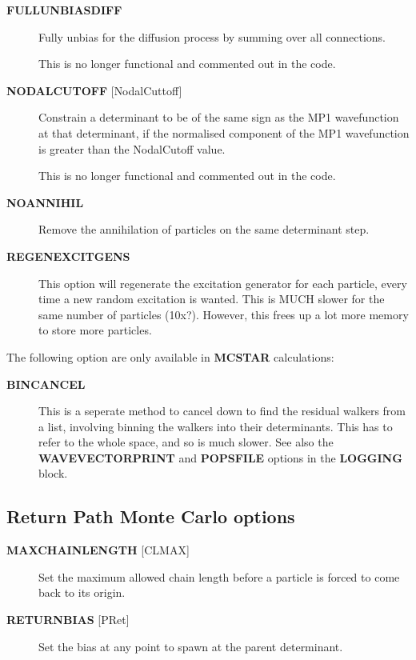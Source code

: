 \documentclass[openany,a4paper,10pt]{manual}
\begin{document}
\begin{description}
\item[\textbf{FULLUNBIASDIFF}]
Fully unbias for the diffusion process by summing over all connections.

This is no longer functional and commented out in the code.

\item[\textbf{NODALCUTOFF} {[}NodalCuttoff{]}]
Constrain a determinant to be of the same sign as the MP1
wavefunction at that determinant, if the normalised component of
the MP1 wavefunction is greater than the NodalCutoff value.

This is no longer functional and commented out in the code.

\item[\textbf{NOANNIHIL}]
Remove the annihilation of particles on the same
determinant step.

\item[\textbf{REGENEXCITGENS}]
This option will regenerate the excitation generator for each particle, every time a
new random excitation is wanted. This is MUCH slower for the same number of particles
(10x?). However, this frees up a lot more memory to store more particles.

\end{description}

The following option are only available in \textbf{MCSTAR} calculations:
\begin{description}
\item[\textbf{BINCANCEL}]
This is a seperate method to cancel down to find the residual
walkers from a list, involving binning the walkers into their
determinants. This has to refer to the whole space, and so is
much slower.  See also the \textbf{WAVEVECTORPRINT} and \textbf{POPSFILE}
options in the \textbf{LOGGING} block.

\end{description}


\subsection{Return Path Monte Carlo options}
\begin{description}
\item[\textbf{MAXCHAINLENGTH} {[}CLMAX{]}]
Set the maximum allowed chain length before a particle is forced to
come back to its origin.

\item[\textbf{RETURNBIAS} {[}PRet{]}]
Set the bias at any point to spawn at the parent determinant.

\end{description}
\end{document}
